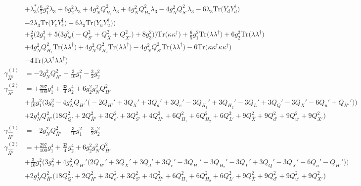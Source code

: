 {\begin{align}
 &+\lambda_3^* \Big(\frac{6}{5} g_{1}^{2} \lambda_3 +6 g_{2}^{2} \lambda_3 +4 g_{N}^{2} Q_{H_1}^{2} \lambda_3 +4 g_{N}^{2} Q_{H_2}^{2} \lambda_3 -4 g_{N}^{2} Q_{S'}^{2} \lambda_3 -6 \lambda_3 \mbox{Tr}\Big({Y_d  Y_{d}^{\dagger}}\Big) \nonumber \\ 
 &-2 \lambda_3 \mbox{Tr}\Big({Y_e  Y_{e}^{\dagger}}\Big) -6 \lambda_3 \mbox{Tr}\Big({Y_u  Y_{u}^{\dagger}}\Big) \Big)\nonumber \\ 
 &+\frac{2}{5} \Big(2 g_{1}^{2}  + 5 \Big(3 g_{N}^{2} \Big(- Q_{S'}^{2}  + Q_{\bar{X}}^{2} + Q_{X'}^{2}\Big) + 8 g_{3}^{2} \Big)\Big)\mbox{Tr}\Big({\kappa  \kappa^{\dagger}}\Big) +\frac{6}{5} g_{1}^{2} \mbox{Tr}\Big({\lambda  \lambda^{\dagger}}\Big) +6 g_{2}^{2} \mbox{Tr}\Big({\lambda  \lambda^{\dagger}}\Big) \nonumber \\ 
 &+4 g_{N}^{2} Q_{H_1}^{2} \mbox{Tr}\Big({\lambda  \lambda^{\dagger}}\Big) +4 g_{N}^{2} Q_{H_2}^{2} \mbox{Tr}\Big({\lambda  \lambda^{\dagger}}\Big) -4 g_{N}^{2} Q_{S'}^{2} \mbox{Tr}\Big({\lambda  \lambda^{\dagger}}\Big) -6 \mbox{Tr}\Big({\kappa  \kappa^{\dagger}  \kappa  \kappa^{\dagger}}\Big) \nonumber \\ 
 &-4 \mbox{Tr}\Big({\lambda  \lambda^{\dagger}  \lambda  \lambda^{\dagger}}\Big) \\ 
\gamma_{\hat{H'}}^{(1)} & =  
-2 g_{N}^{2} Q_{H'}^{2}  -\frac{3}{10} g_{1}^{2}  -\frac{3}{2} g_{2}^{2} \\ 
\gamma_{\hat{H'}}^{(2)} & =  
+\frac{297}{100} g_{1}^{4} +\frac{33}{4} g_{2}^{4} +6 g_{2}^{2} g_{N}^{2} Q_{H'}^{2} \nonumber \\ 
 &+\frac{3}{10} g_{1}^{2} \Big(3 g_{2}^{2}  -4 g_{N}^{2} Q_{H'}' \Big(-2 Q_{H'}'  + 3 Q_{\bar{X}}'  + 3 Q_d'  + 3 Q_e'  -3 Q_{H_1}'  + 3 Q_{H_2}'  -3 Q_L'  + 3 Q_Q'  -3 Q_X'  -6 Q_u'  + Q_{\bar{H}'}'\Big)\Big)\nonumber \\ 
 &+2 g_{N}^{4} Q_{H'}^{2} \Big(18 Q_{Q'}^{2}  + 2 Q_{\bar{H}'}^{2}  + 3 Q_{e'}^{2}  + 3 Q_{S'}^{2}  + 4 Q_{H'}^{2}  + 6 Q_{H_1}^{2}  + 6 Q_{H_2}^{2}  + 6 Q_{L'}^{2}  + 9 Q_{\bar{X}}^{2}  + 9 Q_{d'}^{2}  + 9 Q_{u'}^{2}  + 9 Q_{X'}^{2} \Big)\\ 
\gamma_{\hat{\bar{H'}}}^{(1)} & =  
-2 g_{N}^{2} Q_{\bar{H}'}^{2}  -\frac{3}{10} g_{1}^{2}  -\frac{3}{2} g_{2}^{2} \\ 
\gamma_{\hat{\bar{H'}}}^{(2)} & =  
+\frac{297}{100} g_{1}^{4} +\frac{33}{4} g_{2}^{4} +6 g_{2}^{2} g_{N}^{2} Q_{\bar{H}'}^{2} \nonumber \\ 
 &+\frac{3}{10} g_{1}^{2} \Big(3 g_{2}^{2}  + 4 g_{N}^{2} Q_{\bar{H}'}' \Big(2 Q_{\bar{H}'}'  + 3 Q_{\bar{X}}'  + 3 Q_d'  + 3 Q_e'  -3 Q_{H_1}'  + 3 Q_{H_2}'  -3 Q_L'  + 3 Q_Q'  -3 Q_X'  -6 Q_u'  - Q_{H'}' \Big)\Big)\nonumber \\ 
 &+2 g_{N}^{4} Q_{\bar{H}'}^{2} \Big(18 Q_{Q'}^{2}  + 2 Q_{H'}^{2}  + 3 Q_{e'}^{2}  + 3 Q_{S'}^{2}  + 4 Q_{\bar{H}'}^{2}  + 6 Q_{H_1}^{2}  + 6 Q_{H_2}^{2}  + 6 Q_{L'}^{2}  + 9 Q_{\bar{X}}^{2}  + 9 Q_{d'}^{2}  + 9 Q_{u'}^{2}  + 9 Q_{X'}^{2} \Big)
\end{align} } 
